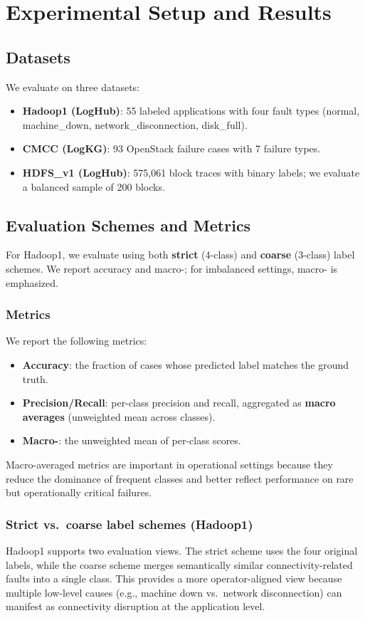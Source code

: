 
\chapter{Experimental Setup and Results}

\section{Datasets}
We evaluate on three datasets:
\begin{itemize}
  \item \textbf{Hadoop1 (LogHub)}: 55 labeled applications with four fault types (normal,
        machine\_down, network\_disconnection, disk\_full).
  \item \textbf{CMCC (LogKG)}: 93 OpenStack failure cases with 7 failure types.
  \item \textbf{HDFS\_v1 (LogHub)}: 575,061 block traces with binary labels; we evaluate a
        balanced sample of 200 blocks.
\end{itemize}

\section{Evaluation Schemes and Metrics}
For Hadoop1, we evaluate using both \textbf{strict} (4-class) and \textbf{coarse} (3-class) label
schemes. We report accuracy and macro-\fone{}; for imbalanced settings, macro-\fone{} is
emphasized.

\subsection{Metrics}
We report the following metrics:
\begin{itemize}
  \item \textbf{Accuracy}: the fraction of cases whose predicted label matches the ground truth.
  \item \textbf{Precision/Recall}: per-class precision and recall, aggregated as \textbf{macro
        averages} (unweighted mean across classes).
  \item \textbf{Macro-\fone{}}: the unweighted mean of per-class \fone{} scores.
\end{itemize}
Macro-averaged metrics are important in operational settings because they reduce the dominance of
frequent classes and better reflect performance on rare but operationally critical failures.

\subsection{Strict vs.\ coarse label schemes (Hadoop1)}
Hadoop1 supports two evaluation views. The strict scheme uses the four original labels, while the
coarse scheme merges semantically similar connectivity-related faults into a single class. This
provides a more operator-aligned view because multiple low-level causes (e.g., machine down vs.\
network disconnection) can manifest as connectivity disruption at the application level.

